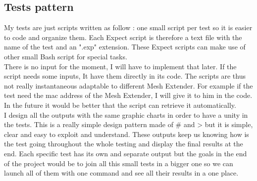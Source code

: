 \subsection{Tests pattern}
My tests are just scripts written as follow : one small script per test so it is easier to code and organize them. Each Expect script is therefore a text file with the name of the test and an 
".exp" extension. These Expect scripts can make use of other small Bash script for special tasks. 
\\
There is no input for the moment, I will have to implement that later. If the script needs some inputs, It have them directly in its code. The scripts are thus not really instantaneous adaptable to different Mesh Extender. For example if the test need the mac address of the Mesh Extender, I will give it to him in the code. In the future it would be better that the script can retrieve it automatically.
\\
I design all the outputs with the same graphic charts in order to have a unity in the tests. This is a really simple design pattern made of \# and > but it is simple, clear and easy to exploit and understand. These outputs keep us knowing how is the test going throughout the whole testing and display the final results at the end. Each specific test has its own and separate output but the goals in the end of the project would be to join all this small tests in a bigger one so we can launch all of them with one command and see all their results in a one place. 
